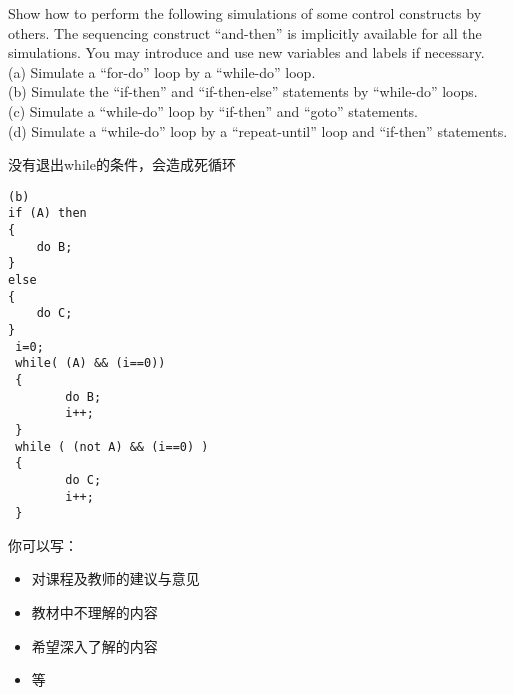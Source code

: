 \documentclass[11pt, a4paper, UTF8]{ctexart}
\begin{document}
\begin{solution}
\end{solution}

\begincorrection	%

\begin{problem}[DH:2.5]
 Show how to perform the following simulations of some control constructs by others. The sequencing construct “and-then” is implicitly available for all the simulations. You may introduce and use new variables and labels if necessary.\\
(a) Simulate a “for-do” loop by a “while-do” loop.\\
(b) Simulate the “if-then” and “if-then-else” statements by “while-do” loops.\\
(c) Simulate a “while-do” loop by “if-then” and “goto” statements.\\
(d) Simulate a “while-do” loop by a “repeat-until” loop and “if-then” statements.
\end{problem}

\begin{cause}
  没有退出while的条件，会造成死循环
\end{cause}

\begin{revision}
\begin{verbatim}
(b)
if (A) then
{
	do B;
}
else
{
	do C;
}
 i=0;
 while( (A) && (i==0))
 {
 		do B;
 		i++;
 }
 while ( (not A) && (i==0) )
 {
 		do C;
 		i++;
 }

\end{verbatim}
\end{revision}
\beginfb	%

你可以写：
\begin{itemize}
  \item 对课程及教师的建议与意见
  \item 教材中不理解的内容
  \item 希望深入了解的内容
  \item 等
\end{itemize}
\end{document}
